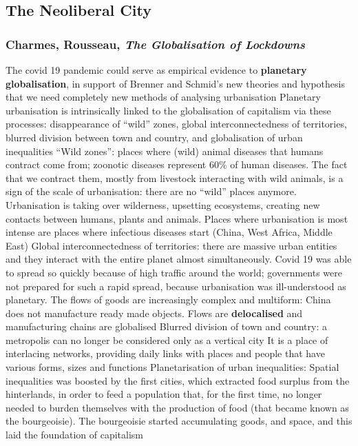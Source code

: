 \documentclass{article}
\begin{document}
\subsection{The Neoliberal City}

\subsubsection{Charmes, Rousseau, \textit{The Globalisation of Lockdowns}}

\begin{outline}
	\1 The covid 19 pandemic could serve as empirical evidence to \textbf{planetary globalisation}, in support of Brenner and Schmid's new theories and hypothesis that we need completely new methods of analysing urbanisation
	\1 Planetary urbanisation is intrinsically linked to the globalisation of capitalism via these processes: disappearance of ``wild'' zones, global interconnectedness of territories, blurred division between town and country, and globalisation of urban inequalities
	\1 ``Wild zones'': places where (wild) animal diseases that humans contract come from; zoonotic diseases represent 60\% of human diseases. The fact that we contract them, mostly from livestock interacting with wild animals, is a sign of the scale of urbanisation: there are no ``wild'' places anymore. Urbanisation is taking over wilderness, upsetting ecosystems, creating new contacts between humans, plants and animals.
		\2 Places where urbanisation is most intense are places where infectious diseases start (China, West Africa, Middle East)
	\1 Global interconnectedness of territories: there are massive urban entities and they interact with the entire planet almost simultaneously. 
		\2 Covid 19 was able to spread so quickly because of high traffic around the world; governments were not prepared for such a rapid spread, because urbanisation was ill-understood as planetary. 
		\2 The flows of goods are increasingly complex and multiform: China does not manufacture ready made objects. Flows are \textbf{delocalised} and manufacturing chains are globalised
	\1 Blurred division of town and country: a metropolis can no longer be considered only as a vertical city
		\2 It is a place of interlacing networks, providing daily links with places and people that have various forms, sizes and functions
	\1 Planetarisation of urban inequalities:
		\2 Spatial inequalities was boosted by the first cities, which extracted food surplus from the hinterlands, in order to feed a population that, for the first time, no longer needed to burden themselves with the production of food (that became known as the bourgeoisie). The bourgeoisie started accumulating goods, and space, and this laid the foundation of capitalism

\end{outline}
\end{document}
